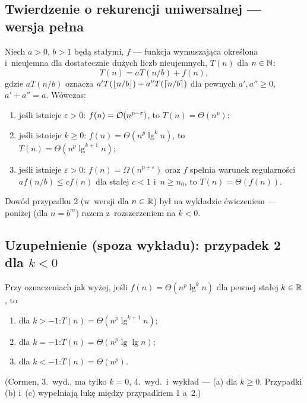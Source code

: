 \documentclass[11pt]{article}
\begin{document}
\subsection*{Twierdzenie o rekurencji uniwersalnej --- wersja pełna}

\begin{twierdzenie}\label{tw:masterpelne}
Niech $a>0$, $b>1$ będą stałymi, $f$ --- funkcja wymuszająca określona
i~nieujemna dla dostatecznie dużych liczb nieujemnych, $T(n)$ dla $n\in\mathbb{N}$:
\[
T(n)=aT(n/b)+f(n),
\]
gdzie $aT(n/b)$ oznacza $a'T(\left\lfloor n/b \right\rfloor)+a''T(\left\lceil n/b \right\rceil)$ dla pewnych
$a',a''\ge0$, $a'+a''=a$. Wówczas:
\begin{enumerate}
\item jeśli istnieje $\varepsilon>0$: $f(n)=\mathcal{O}(n^{p-\varepsilon})$, to $T(n)=\Theta(n^p)$;
\item jeśli istnieje $k\ge0$: $f(n)=\Theta(n^p\lg^kn)$, to\\
$T(n)=\Theta(n^p\lg^{k+1}n)$;
\item jeśli istnieje $\varepsilon>0$: $f(n)=\Omega(n^{p+\varepsilon})$ oraz $f$
spełnia warunek regularności $af(n/b)\le cf(n)$ dla stałej $c<1$ i~$n\ge n_0$,
to $T(n)=\Theta(f(n))$.
\end{enumerate}
\end{twierdzenie}
Dowód przypadku 2 (w~wersji dla $n\in\mathbb{R}$) był na wykładzie ćwiczeniem ---
poniżej (dla $n=b^m$) razem z~rozszerzeniem na $k<0$.

\subsection*{Uzupełnienie (spoza wykładu): przypadek 2 dla \texorpdfstring{$k<0$}{k<0}}

\begin{twierdzenie}\label{tw:master2}
Przy oznaczeniach jak wyżej, jeśli $f(n)=\Theta(n^{p}\lg^k n)$ dla pewnej
stałej $k\in\mathbb{R}$, to
\begin{enumerate}[label=(\alph*)]
\item dla $k>-1$:\quad $T(n)=\Theta(n^{p}\lg^{k+1}n)$;
\item dla $k=-1$:\quad $T(n)=\Theta(n^{p}\lg\lg n)$;
\item dla $k<-1$:\quad $T(n)=\Theta(n^{p})$.
\end{enumerate}
(Cormen, 3.~wyd., ma tylko $k=0$, 4.~wyd.\ i~wykład --- (a) dla $k\ge0$.
Przypadki (b) i~(c) wypełniają lukę między przypadkiem 1 a~2.)
\end{twierdzenie}
\end{document}
